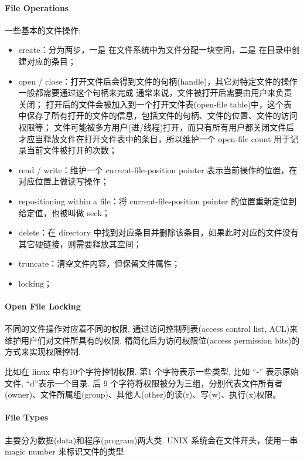 \paragraph{File Operations}
一些基本的文件操作:
\begin{itemize}\small
    \item create：分为两步，一是 在文件系统中为文件分配一块空间，二是 在目录中创建对应的条目；
    \item open / close：打开文件后会得到文件的句柄(handle)，其它对特定文件的操作一般都需要通过这个句柄来完成
    \subitem 通常来说，文件被打开后需要由用户来负责关闭；
    \subitem 打开后的文件会被加入到一个打开文件表(open-file table)中，这个表中保存了所有打开的文件的信息，包括文件的句柄、文件的位置、文件的访问权限等；
    \subitem 文件可能被多方用户(进/线程)打开，而只有所有用户都关闭文件后才应当释放文件在打开文件表中的条目，所以维护一个 open-file count 用于记录当前文件被打开的次数；
    \item read / write：维护一个 current-file-position pointer 表示当前操作的位置，在对应位置上做读写操作；
    \item repositioning within a file：将 current-file-position pointer 的位置重新定位到给定值，也被叫做 seek；
    \item delete：在 directory 中找到对应条目并删除该条目，如果此时对应的文件没有其它硬链接，则需要释放其空间；
    \item truncate：清空文件内容，但保留文件属性；
    \item locking；
\end{itemize}

\paragraph{Open File Locking}不同的文件操作对应着不同的权限, 通过访问控制列表(access control list, ACL)来维护用户们对文件所具有的权限. 精简化后为访问权限位(access permission bits)的方式来实现权限控制. 

比如在 linux 中有10个字符控制权限. 第1 个字符表示一些类型, 比如 ``-'' 表示原始文件, ``d''表示一个目录. 后 9 个字符将权限被分为三组，分别代表文件所有者(owner)、文件所属组(group)、其他人(other)的读(r)、写(w)、执行(x)权限。

\paragraph{File Types}主要分为数据(data)和程序(program)两大类. UNIX 系统会在文件开头，使用一串 magic number 来标识文件的类型. 

